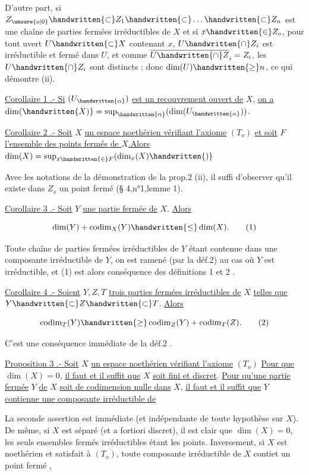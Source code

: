 D'autre part, si $Z_{\unsure{o|0}}\handwritten{\subset} Z_1\handwritten{\subset}\ldots\handwritten{\subset}Z_n$ est une chaîne de parties fermées irréductibles de $X$ et si $x\handwritten{\in}Z_o$, pour tout uvert $U\handwritten{\subset}X$ contenant $x$, $U\handwritten{\cap}Z_i$ est irréductible et fermé dans $U$, et comme $\overline{U\handwritten{\cap}Z}_i=Z_i$, les $U\handwritten{\cap}Z_i$ sont distincts ; donc $\dim(U)\handwritten{\geq}n$, ce qui démontre (ii).

\uline{Corollaire 1 .- Si} $(U_{\handwritten{\alpha}})$ \uline{est un recouvrement ouvert de} $X$, \uline{on a} $\dim(\handwritten{X)}=\sup_{\handwritten{\alpha}}(\dim(U_{\handwritten{\alpha}}))$.

\uline{Corollaire 2 .- Soit} $X$ \uline{un espace noethérien vérifiant l'axiome} $(T_o)$ \uline{et soit} $F$ \uline{l'ensemble des points fermés de $X$.Alors} $\dim(X)=\sup_{x\handwritten{\in}F}(\dim_x(X)\handwritten{)}$

Avec les notations de la démonstration de la prop.2 (ii), il suffi d'observer qu'il existe dans $Z_o$ un point fermé (\S{} 4,n°1,lemme 1).

\uline{Corollaire 3 .- Soit} $Y$ \uline{une partie fermée de} $X$. \uline{Alors}

\[
 \dim(Y)+\operatorname{codim}_X(Y)\handwritten{\leq}\dim(X).\tag*{(1)}
\]

Toute chaîne de parties fermées irréductibles de $Y$ étant contenue dans une composante irréductible de $Y$, on est ramené (par la déf.2) au cas où $Y$ est irréductible, et (1) est alors conséquence des définitions 1 et 2 .

\uline{Corollaire 4 .- Soient} $Y,Z,T$ \uline{trois parties fermées irréductibles de} $X$ \uline{telles que} $Y\handwritten{\subset}Z\handwritten{\subset}T$. \uline{Alors}

\[
 \operatorname{codim}_T(Y)\handwritten{\geq}\operatorname{codim}_Z(Y)+\operatorname{codim}_T(Z).\tag*{(2)}
\]

C'est une conséquence immédiate de la déf.2 .

\uline{Proposition 3 .- Soit} $X$ \uline{un espace noethérien vérifiant l'axiome} $(T_o)$ \uline{Pour que} $\dim(X)=0$, \uline{il faut et il suffit que} $X$ \uline{soit fini et discret}. \uline{Pour qu'une partie fermée} $Y$ \uline{de} $X$ \uline{soit de codimension nulle dans} $X$, \uline{il faut et il suffit que} $Y$ \uline{contienne une composante irréductible de}

La seconde assertion est immédiate (et indépendante de toute hypothèse sur $X$). De même, si $X$ est séparé (et a fortiori discret), il est clair que $\dim(X)=0$, les seuls ensembles fermés irréductibles étant les points. Inversement, si $X$ est noethérien et satisfait à $(T_o)$, toute composante irréductible de $X$ contiet un point fermé ,
